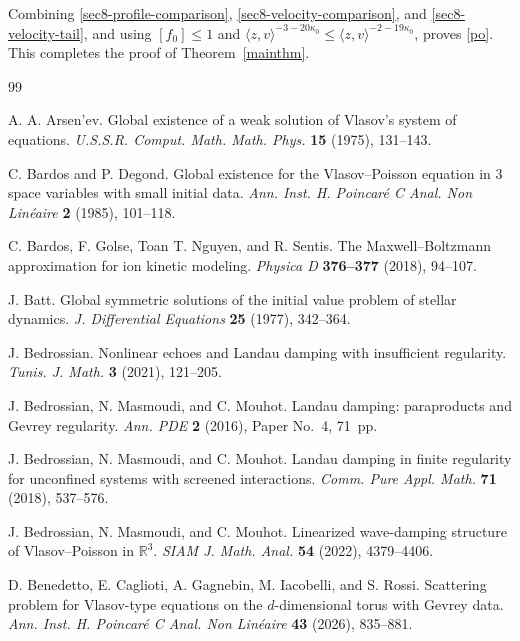 \documentclass[reqno,11pt]{amsart}
\numberwithin{equation}{section}
\begin{document}
Combining \eqref{sec8-profile-comparison},
\eqref{sec8-velocity-comparison}, and
\eqref{sec8-velocity-tail}, and using
$[f_0]\leq1$ and
$\langle z,v\rangle^{-3-20\kappa_0}
\leq\langle z,v\rangle^{-2-19\kappa_0}$,
proves \eqref{po}. This completes the proof of
Theorem~\ref{mainthm}.

\begin{thebibliography}{99}
	
	A. A. Arsen'ev. Global existence of a weak solution of Vlasov's system of equations.
	\emph{U.S.S.R. Comput. Math. Math. Phys.} \textbf{15} (1975), 131--143.
	
	C. Bardos and P. Degond. Global existence for the Vlasov--Poisson equation in 3 space variables with small initial data.
	\emph{Ann. Inst. H. Poincar\'e C Anal. Non Lin\'eaire} \textbf{2} (1985), 101--118.
	
	C. Bardos, F. Golse, Toan T. Nguyen, and R. Sentis. The Maxwell--Boltzmann approximation for ion kinetic modeling.
	\emph{Physica D} \textbf{376--377} (2018), 94--107.
	
	J. Batt. Global symmetric solutions of the initial value problem of stellar dynamics.
	\emph{J. Differential Equations} \textbf{25} (1977), 342--364.
	
	J. Bedrossian. Nonlinear echoes and Landau damping with insufficient regularity.
	\emph{Tunis. J. Math.} \textbf{3} (2021), 121--205.
	
	J. Bedrossian, N. Masmoudi, and C. Mouhot. Landau damping: paraproducts and Gevrey regularity.
	\emph{Ann. PDE} \textbf{2} (2016), Paper No.~4, 71~pp.
	
	J. Bedrossian, N. Masmoudi, and C. Mouhot. Landau damping in finite regularity for unconfined systems with screened interactions.
	\emph{Comm. Pure Appl. Math.} \textbf{71} (2018), 537--576.
	
	J. Bedrossian, N. Masmoudi, and C. Mouhot. Linearized wave-damping structure of Vlasov--Poisson in $\mathbb{R}^3$.
	\emph{SIAM J. Math. Anal.} \textbf{54} (2022), 4379--4406.
	
	D. Benedetto, E. Caglioti, A. Gagnebin, M. Iacobelli, and S. Rossi. Scattering problem for Vlasov-type equations on the $d$-dimensional torus with Gevrey data.
	\emph{Ann. Inst. H. Poincar\'e C Anal. Non Lin\'eaire} \textbf{43} (2026), 835--881.
	

\end{thebibliography}
\end{document}
